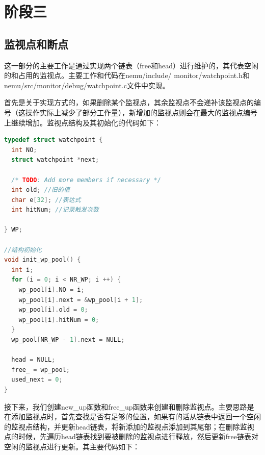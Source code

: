 \documentclass[UTF8,a4paper,10pt]{ctexart}
\begin{document}
\section{阶段三}
\subsection*{监视点和断点}
这一部分的主要工作是通过实现两个链表（free和head）进行维护的，其代表空闲的和占用的监视点。主要工作和代码在nemu/include/ monitor/watchpoint.h和nemu/src/monitor/debug/watchpoint.c文件中实现。
\par 首先是关于实现方式的，如果删除某个监视点，其余监视点不会递补该监视点的编号（这操作实际上减少了部分工作量），新增加的监视点则会在最大的监视点编号上继续增加。监视点结构及其初始化的代码如下：
\begin{lstlisting}[language = C]
typedef struct watchpoint {
  int NO;
  struct watchpoint *next;

  /* TODO: Add more members if necessary */
  int old; //旧的值
  char e[32]; //表达式
  int hitNum; //记录触发次数

} WP;

//结构初始化
void init_wp_pool() {
  int i;
  for (i = 0; i < NR_WP; i ++) {
    wp_pool[i].NO = i;
    wp_pool[i].next = &wp_pool[i + 1];
    wp_pool[i].old = 0;
    wp_pool[i].hitNum = 0;
  }
  wp_pool[NR_WP - 1].next = NULL;

  head = NULL;
  free_ = wp_pool;
  used_next = 0;
}
\end{lstlisting}
\par 接下来，我们创建new\_up函数和free\_up函数来创建和删除监视点。主要思路是在添加监视点时，首先查找是否有足够的位置，如果有的话从链表中返回一个空闲的监视点结构，并更新head链表，将新添加的监视点添加到其尾部；在删除监视点的时候，先遍历head链表找到要被删除的监视点进行释放，然后更新free链表对空闲的监视点进行更新。其主要代码如下：
\end{document}
